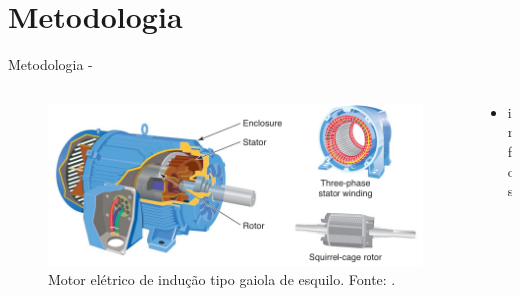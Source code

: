 \documentclass[aspectratio=169]{beamer}
\begin{document}
\section{Metodologia}
\begin{frame}{Metodologia - }
	\begin{columns}
    	\begin{column}{0.50\textwidth}
			\begin{figure}[HT]
				\begin{center}
				\includegraphics[scale=.25]{../referencial/img/ind_motor_petruzella_p115.png}
				\caption{Motor elétrico de indução tipo gaiola de esquilo. \newline
				Fonte: .}
				\label{fig:ind_motor_petruzella_p115}
				\end{center}
			\end{figure}
     	\end{column}
		
		\begin{column}{0.5\textwidth}
			\begin{itemize}
				\item infos
			\end{itemize}
	 	\end{column}
	 \end{columns}
\end{frame}

\end{document}
